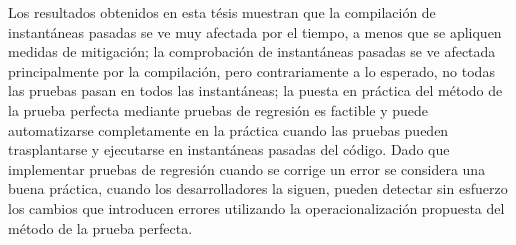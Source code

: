 Los resultados obtenidos en esta tésis muestran que la compilación de instantáneas pasadas se ve muy afectada por el tiempo, a menos que se apliquen medidas de mitigación; 
la comprobación de instantáneas pasadas se ve afectada principalmente por la compilación, pero contrariamente a lo esperado, no todas las pruebas pasan en todos las instantáneas;
la puesta en práctica del método de la prueba perfecta mediante pruebas de regresión es factible y puede automatizarse completamente en la práctica cuando las pruebas pueden trasplantarse y ejecutarse en instantáneas pasadas del código.
Dado que implementar pruebas de regresión cuando se corrige un error se considera una buena práctica, cuando los desarrolladores la siguen, pueden detectar sin esfuerzo los cambios que introducen errores utilizando la operacionalización propuesta del método de la prueba perfecta.